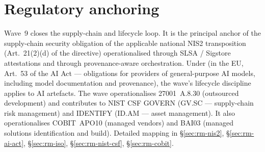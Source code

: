 \section{Regulatory anchoring}
\label{sec:w9-regulatory}

\noindent Wave~9 closes the supply-chain and lifecycle loop. It
is the principal anchor of the supply-chain security obligation
of the applicable national NIS2 transposition (Art.~21(2)(d) of
the directive) operationalised through SLSA / Sigstore attestations
and through provenance-aware orchestration. Under  (in the EU, Art.~53 of the AI Act ---
obligations for providers of general-purpose AI models, including
model documentation and provenance), the wave's lifecycle
discipline applies to AI artefacts. The wave operationalises 27001~A.8.30 (outsourced
development) and contributes to NIST CSF \textsf{GOVERN}
(GV.SC --- supply-chain risk management) and \textsf{IDENTIFY}
(ID.AM --- asset management). It also operationalises
COBIT~APO10 (managed vendors) and BAI03 (managed solutions
identification and build). Detailed mapping in
 \S\ref{sec:rm-nis2},
\S\ref{sec:rm-ai-act}, \S\ref{sec:rm-iso},
\S\ref{sec:rm-nist-csf}, \S\ref{sec:rm-cobit}.
